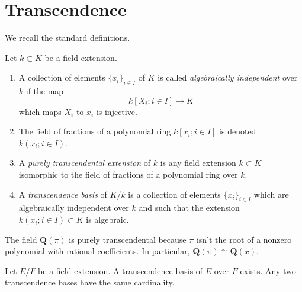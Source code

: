 \section{Transcendence}
\label{section-transcendence}

\noindent
We recall the standard definitions.

\begin{definition}
\label{definition-transcendence}
Let $k \subset K$ be a field extension.
\begin{enumerate}
\item A collection of elements $\{x_i\}_{i \in I}$ of $K$ is called
{\it algebraically independent} over $k$ if the map
$$
k[X_i; i\in I] \longrightarrow K
$$
which maps $X_i$ to $x_i$ is injective.
\item The field of fractions of a polynomial ring
$k[x_i; i \in I]$ is denoted $k(x_i; i\in I)$.
\item A {\it purely transcendental extension} of $k$ is any
field extension $k \subset K$ isomorphic to the field of
fractions of a polynomial ring over $k$.
\item A {\it transcendence basis} of $K/k$ is a
collection of elements $\{x_i\}_{i \in I}$ which are
algebraically independent over $k$ and such that
the extension $k(x_i; i\in I) \subset K$ is algebraic.
\end{enumerate}
\end{definition}

\begin{example}
\label{example-pi-transcendental}
The field $\mathbf{Q}(\pi)$ is purely transcendental because
$\pi$ isn't the root of a nonzero polynomial with rational coefficients.
In particular, $\mathbf{Q}(\pi) \cong \mathbf{Q}(x)$.
\end{example}

\begin{lemma}
\label{lemma-transcendence-degree}
Let $E/F$ be a field extension. A transcendence basis of $E$ over $F$ exists.
Any two transcendence bases have the same cardinality.
\end{lemma}

